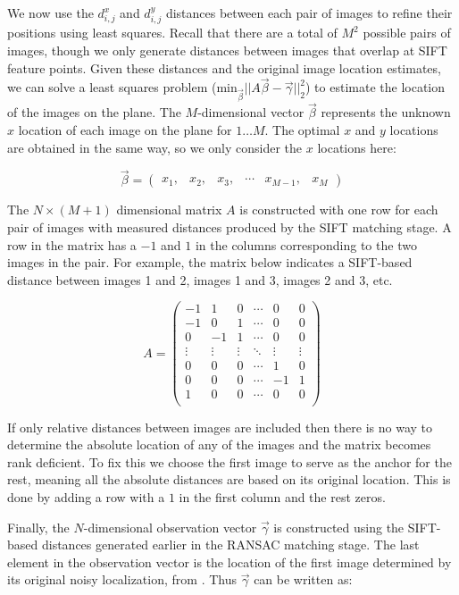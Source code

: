 \documentclass[10pt,twocolumn,letterpaper]{article}
\begin{document}
We now use the $d^x_{i,j}$ and $d^y_{i,j}$ distances between each pair
of images to refine their positions using least squares. Recall that
there are a total of $M^{2}$ possible pairs of images, though we only
generate distances between images that overlap at SIFT feature
points. Given these distances and the original image location
estimates, we can solve a least squares problem
($\textrm{min}_{\vec{\beta}} ||A \vec{\beta} - \vec{\gamma}||_2^2 $)
to estimate the location of the images on the plane. The
$M$-dimensional vector $\vec{\beta}$ represents the unknown $x$
location of each image on the plane for $1 \dots M$. The optimal $x$
and $y$ locations are obtained in the same way, so we only consider
the $x$ locations here:

\[\vec{\beta} =
\begin{pmatrix}
  x_1, & x_2, & x_3, & \cdots & x_{M-1}, & x_M
\end{pmatrix}
\]

The $N \times (M+1)$ dimensional matrix $A$ is constructed with one
row for each pair of images with measured distances produced by the
SIFT matching stage. A row in the matrix has a $-1$ and $1$ in the
columns corresponding to the two images in the pair. For example, the
matrix below indicates a SIFT-based distance between images 1 and 2,
images 1 and 3, images 2 and 3, etc.

\[
A =
\begin{pmatrix}
  -1 & 1 & 0 & \cdots & 0 & 0\\
  -1 & 0 & 1 & \cdots & 0 & 0\\
  0 & -1 & 1 & \cdots & 0 & 0\\
  \vdots  & \vdots & \vdots & \ddots & \vdots  & \vdots\\
  0 & 0 & 0 & \cdots & 1 & 0 \\
  0 & 0 & 0 & \cdots & -1 & 1 \\
  1 & 0 & 0 & \cdots & 0 & 0 \\
\end{pmatrix}
\]

If only relative distances between images are included then there is
no way to determine the absolute location of any of the images and the
matrix becomes rank deficient. To fix this we choose the first image
to serve as the anchor for the rest, meaning all the absolute
distances are based on its original location. This is done by adding a
row with a $1$ in the first column and the rest zeros.

Finally, the $N$-dimensional observation vector $\vec{\gamma}$ is
constructed using the SIFT-based distances generated earlier in the
RANSAC matching stage. The last element in the observation vector is
the location of the first image determined by its original noisy
localization, from \cite{chen2010indoor, liu2010indoor}. Thus
$\vec{\gamma}$ can be written as:
\end{document}
